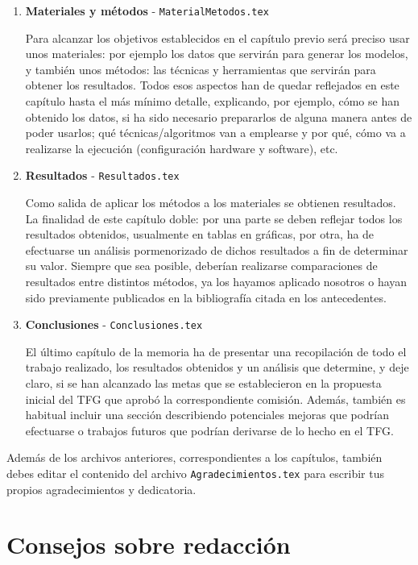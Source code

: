 \begin{enumerate}
    \item \textbf{Materiales y métodos} - \texttt{MaterialMetodos.tex} \par
          Para alcanzar los objetivos establecidos en el capítulo previo será preciso usar unos materiales: por ejemplo los datos que servirán para generar los modelos, y también unos métodos: las técnicas y herramientas que servirán para obtener los resultados. Todos esos aspectos han de quedar reflejados en este capítulo hasta el más mínimo detalle, explicando, por ejemplo, cómo se han obtenido los datos, si ha sido necesario prepararlos de alguna manera antes de poder usarlos; qué técnicas/algoritmos van a emplearse y por qué, cómo va a realizarse la ejecución (configuración hardware y software), etc.

    \item \textbf{Resultados} - \texttt{Resultados.tex} \par
          Como salida de aplicar los métodos a los materiales se obtienen resultados. La finalidad de este capítulo doble: por una parte se deben reflejar todos los resultados obtenidos, usualmente en tablas en gráficas, por otra, ha de efectuarse un análisis pormenorizado de dichos resultados a fin de determinar su valor. Siempre que sea posible, deberían realizarse comparaciones de resultados entre distintos métodos, ya los hayamos aplicado nosotros o hayan sido previamente publicados en la bibliografía citada en los antecedentes.

    \item \textbf{Conclusiones} - \texttt{Conclusiones.tex} \par
          El último capítulo de la memoria ha de presentar una recopilación de todo el trabajo realizado, los resultados obtenidos y un análisis que determine, y deje claro, si se han alcanzado las metas que se establecieron en la propuesta inicial del TFG que aprobó la correspondiente comisión. Además, también es habitual incluir una sección describiendo potenciales mejoras que podrían efectuarse o trabajos futuros que podrían derivarse de lo hecho en el TFG.
\end{enumerate}

Además de los archivos anteriores, correspondientes a los capítulos, también debes editar el contenido del archivo \texttt{Agradecimientos.tex} para escribir tus propios agradecimientos y dedicatoria.

\section{Consejos sobre redacción}

